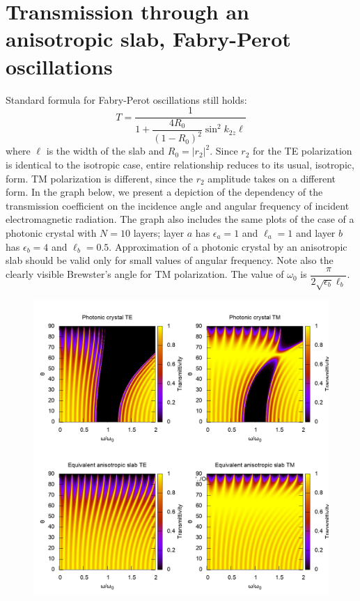 \documentclass[a4paper]{scrartcl}
\begin{document}
\section{Transmission through an anisotropic slab, Fabry-Perot oscillations}
Standard formula for Fabry-Perot oscillations still holds:
\begin{equation}
      T = \dfrac{1}{1 + \dfrac{4R_0}{(1-R_0)^2}\sin^2 k_{2z} \ell}
\end{equation}
where $\ell$ is the width of the slab and $R_0 = \left|r_2\right|^2$. Since $r_2$ for the TE polarization is identical
to the isotropic case, entire relationship reduces to its usual, isotropic, form. TM polarization is different, since
the $r_2$ amplitude takes on a different form. In the graph below, we present a depiction of the dependency of the
transmission coefficient on the incidence angle and angular frequency of incident electromagnetic radiation. The graph
also includes the same plots of the case of a photonic crystal with $N=10$ layers; layer $a$ has $\epsilon_a=1$ and
$\ell_a=1$ and layer $b$ has $\epsilon_b = 4$ and $\ell_b = 0.5$. Approximation of a photonic crystal by an anisotropic
slab should be valid only for small values of angular frequency. Note also the clearly visible Brewster's angle for TM
polarization. The value of $\omega_0$ is $\dfrac{\pi}{2 \sqrt{\epsilon_b}\ell_b}$.
\begin{figure}[b!]
\centering
\includegraphics[width=0.85\linewidth]{../Fabry-Perot/Pics/Compare.png}
\end{figure}
\end{document}
